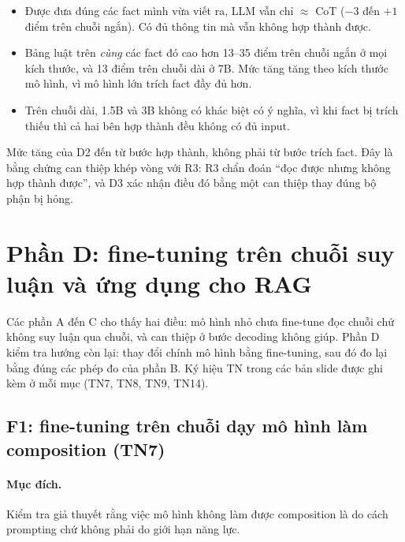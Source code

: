 \documentclass[11pt]{article}
\begin{document}
\begin{cachdoc}
\begin{itemize}[leftmargin=*,itemsep=1pt]
\item Được đưa đúng các fact mình vừa viết ra, LLM vẫn chỉ $\approx$ CoT ($-3$ đến $+1$ điểm trên
  chuỗi ngắn). Có đủ thông tin mà vẫn không hợp thành được.
\item Bảng luật trên \emph{cùng} các fact đó cao hơn 13--35 điểm trên chuỗi ngắn ở mọi kích thước,
  và 13 điểm trên chuỗi dài ở 7B. Mức tăng tăng theo kích thước mô hình, vì mô hình lớn trích fact
  đầy đủ hơn.
\item Trên chuỗi dài, 1.5B và 3B không có khác biệt có ý nghĩa, vì khi fact bị trích thiếu thì cả
  hai bên hợp thành đều không có đủ input.
\end{itemize}
\end{cachdoc}

\begin{ketluan}
Mức tăng của D2 đến từ bước hợp thành, không phải từ bước trích fact. Đây là bằng chứng can thiệp
khép vòng với R3: R3 chẩn đoán ``đọc được nhưng không hợp thành được'', và D3 xác nhận điều đó bằng
một can thiệp thay đúng bộ phận bị hỏng.
\end{ketluan}

\section{Phần D: fine-tuning trên chuỗi suy luận và ứng dụng cho RAG}

Các phần A đến C cho thấy hai điều: mô hình nhỏ chưa fine-tune đọc chuỗi chứ không suy luận qua chuỗi,
và can thiệp ở bước decoding không giúp. Phần D kiểm tra hướng còn lại: thay đổi chính mô hình bằng
fine-tuning, sau đó đo lại bằng đúng các phép đo của phần B. Ký hiệu TN trong các bản slide được ghi
kèm ở mỗi mục (TN7, TN8, TN9, TN14).

\subsection{F1: fine-tuning trên chuỗi dạy mô hình làm composition (TN7)}

\paragraph{Mục đích.} Kiểm tra giả thuyết rằng việc mô hình không làm được composition là do cách
prompting chứ không phải do giới hạn năng lực.
\end{document}
